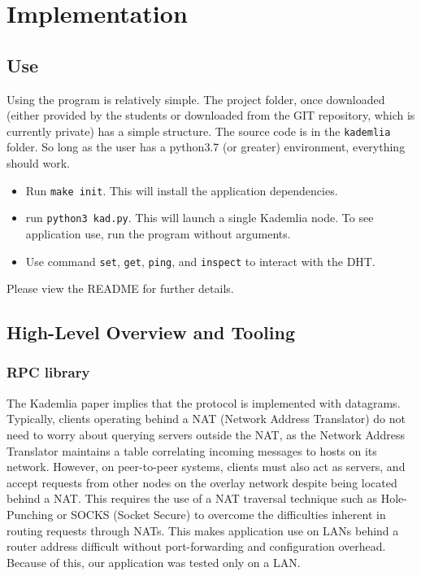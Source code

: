 \documentclass[12pt]{report}
\newcommand{\code}[1]{\colorbox{codegray}{\texttt{#1}}}
\begin{document}
    \section{Implementation}
        \subsection{Use}
            Using the program is relatively simple.  The project folder, once
            downloaded (either provided by the students or downloaded from the
            GIT repository, which is currently private) has a simple
            structure.  The source code is in the \code{kademlia} folder.  So
            long as the user has a python3.7 (or greater) environment,
            everything should work.
            \begin{itemize}
                \item Run \code{make init}. This will install the application
                    dependencies.
                \item run \code{python3 kad.py}.  This will launch a single
                    Kademlia node.  To see application use, run the program
                    without arguments.
                \item Use command \code{set}, \code{get}, \code{ping}, and
                    \code{inspect} to interact with the DHT.
            \end{itemize}
            Please view the README for further details.
        \subsection{High-Level Overview and Tooling}
            \subsubsection{RPC library}
                The Kademlia paper implies that the protocol is implemented
                with datagrams\cite{kademlia}.  Typically, clients operating
                behind a NAT (Network Address Translator) do not need to worry
                about querying servers outside the NAT, as the Network Address
                Translator maintains a table correlating incoming messages to
                hosts on its network.  However, on peer-to-peer systems,
                clients must also act as servers, and accept requests from
                other nodes on the overlay network despite being located behind
                a NAT.  This requires the use of a NAT traversal technique such
                as Hole-Punching or SOCKS (Socket Secure) to overcome the
                difficulties inherent in routing requests through NATs.  This
                makes application use on LANs behind a router address difficult
                without port-forwarding and configuration overhead.  Because of
                this, our application was tested only on a LAN.
\end{document}
